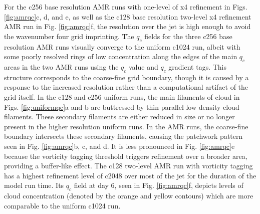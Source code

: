 For the c256 base resolution AMR runs with one-level of x4 refinement
in Figs. \ref{fig:amrqc}c, d, and e, as well as the c128 base resolution two-level x4 
refinement AMR run in Fig. \ref{fig:amrqc}f, the resolution over the jet is high enough
to avoid the wavenumber four grid imprinting. The $q_c$ fields for the
 three c256 base resolution AMR runs visually converge to the uniform c1024 run,
 albeit with some poorly resolved rings of low concentration along the edges of the main $q_c$ areas
 in the two AMR runs using the $q_c$ value and $q_c$ gradient tags. This structure
corresponds to the coarse-fine grid boundary, though it is caused by a response to the increased
resolution rather than a computational artifact of the grid itself.
In the c128 and c256 uniform runs, the main filaments of cloud in Figs. \ref{fig:uniformqc}a and b
are buttressed by thin parallel low density cloud filaments. These secondary filaments are either reduced 
in size or no longer present in the higher resolution uniform runs. In the AMR runs, the coarse-fine
boundary intersects these secondary filaments, causing the patchwork pattern seen in
Fig. \ref{fig:amrqc}b, c, and d. It is less pronounced in Fig. \ref{fig:amrqc}e because the vorticity 
tagging threshold triggers refinement over a broader area, providing a buffer-like effect. The c128 two-level
AMR run with vorticity tagging has a highest refinement level of c2048 over most of the jet for the duration of
the model run time. Its $q_c$ field at day 6, seen in Fig. \ref{fig:amrqc}f, depicts levels of cloud 
concentration (denoted by the orange and yellow contours) which are more comparable to the uniform c1024 run.
 
